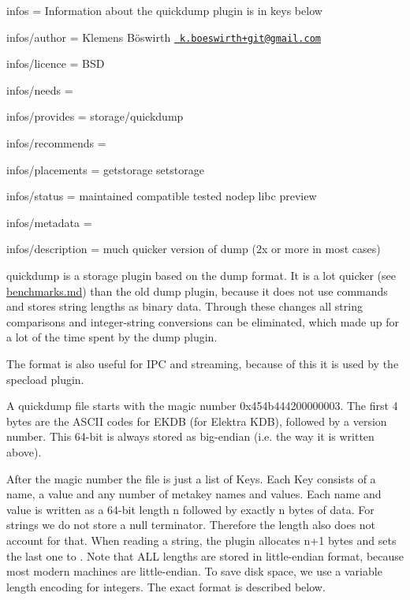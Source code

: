 
\begin{DoxyItemize}
\item infos = Information about the quickdump plugin is in keys below
\item infos/author = Klemens Böswirth \href{mailto:k.boeswirth+git@gmail.com}{\texttt{ k.\+boeswirth+git@gmail.\+com}}
\item infos/licence = B\+SD
\item infos/needs =
\item infos/provides = storage/quickdump
\item infos/recommends =
\item infos/placements = getstorage setstorage
\item infos/status = maintained compatible tested nodep libc preview
\item infos/metadata =
\item infos/description = much quicker version of dump (2x or more in most cases)
\end{DoxyItemize}

{\ttfamily quickdump} is a storage plugin based on the {\ttfamily dump} format. It is a lot quicker (see \mbox{\hyperlink{autotoc_md545_src_plugins_quickdump_benchmarks_md}{benchmarks.md}}) than the old {\ttfamily dump} plugin, because it does not use commands and stores string lengths as binary data. Through these changes all string comparisons and integer-\/string conversions can be eliminated, which made up for a lot of the time spent by the {\ttfamily dump} plugin.

The format is also useful for I\+PC and streaming, because of this it is used by the {\ttfamily specload} plugin.

A {\ttfamily quickdump} file starts with the magic number {\ttfamily 0x454b444200000003}. The first 4 bytes are the A\+S\+C\+II codes for {\ttfamily E\+K\+DB} (for Elektra K\+DB), followed by a version number. This 64-\/bit is always stored as big-\/endian (i.\+e. the way it is written above).

After the magic number the file is just a list of Keys. Each Key consists of a name, a value and any number of metakey names and values. Each name and value is written as a 64-\/bit length {\ttfamily n} followed by exactly {\ttfamily n} bytes of data. For strings we do not store a null terminator. Therefore the length also does not account for that. When reading a string, the plugin allocates {\ttfamily n+1} bytes and sets the last one to {}. Note that A\+LL lengths are stored in little-\/endian format, because most modern machines are little-\/endian. To save disk space, we use a variable length encoding for integers. The exact format is described below.

